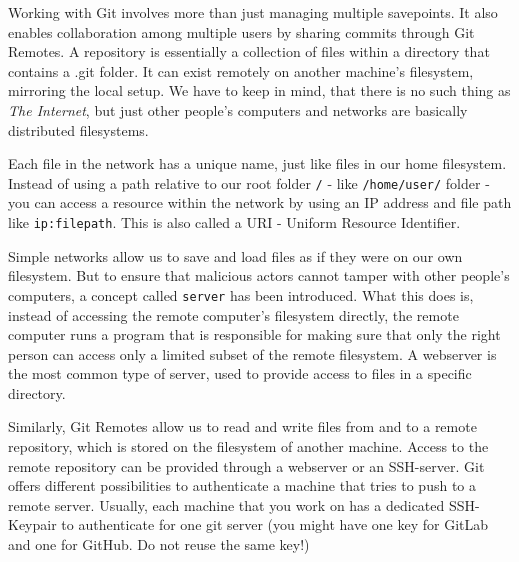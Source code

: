 \documentclass{dcbl/challenge}
\begin{document}
Working with Git involves more than just managing multiple savepoints. It also enables collaboration among multiple users by sharing commits through Git Remotes. A repository is essentially a collection of files within a directory that contains a .git folder. It can exist remotely on another machine's filesystem, mirroring the local setup. 
We have to keep in mind, that there is no such thing as \textit{The Internet}, but just other people's computers and networks are basically distributed filesystems.

Each file in the network has a unique name, just like files in our home filesystem.
Instead of using a path relative to our root folder \texttt{/} - like \texttt{/home/user/} folder - you can access a resource within the network by using an IP address and file path like \texttt{ip:filepath}.
This is also called a URI - Uniform Resource Identifier.

Simple networks allow us to save and load files as if they were on our own filesystem.
But to ensure that malicious actors cannot tamper with other people's computers, a concept called \texttt{server} has been introduced. 
What this does is, instead of accessing the remote computer's filesystem directly, the remote computer runs a program that is responsible for making sure that only the right person can access only a limited subset of the remote filesystem.
A webserver is the most common type of server, used to provide access to files in a specific directory.

Similarly, Git Remotes allow us to read and write files from and to a remote repository, which is stored on the filesystem of another machine.
Access to the remote repository can be provided through a webserver or an SSH-server. Git offers different possibilities to authenticate a machine that tries to push to a remote server. Usually, each machine that you work on has a dedicated SSH-Keypair to authenticate for one git server (you might have one key for GitLab and one for GitHub. Do not reuse the same key!)
\end{document}
